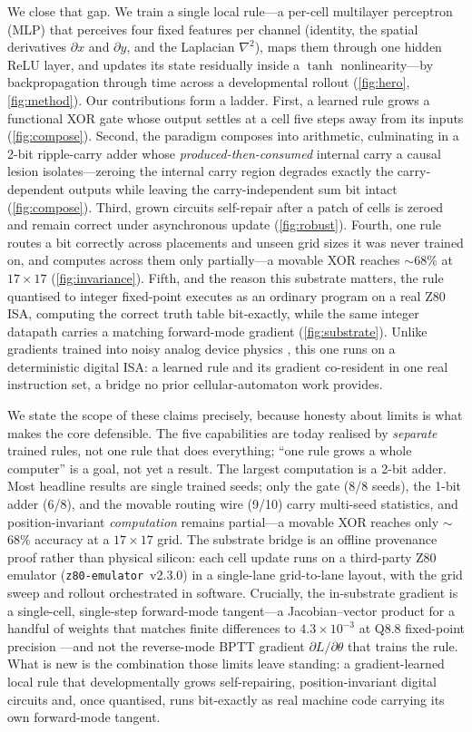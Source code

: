 We close that gap. We train a single local rule---a per-cell multilayer perceptron (MLP) that perceives four fixed features per channel (identity, the spatial derivatives $\partial x$ and $\partial y$, and the Laplacian $\nabla^2$), maps them through one hidden ReLU layer, and updates its state residually inside a $\tanh$ nonlinearity---by backpropagation through time \citep{werbos1990bptt} across a developmental rollout (\ref{fig:hero}, \ref{fig:method}). Our contributions form a ladder. First, a learned rule grows a functional XOR gate whose output settles at a cell five steps away from its inputs (\ref{fig:compose}). Second, the paradigm composes into arithmetic, culminating in a 2-bit ripple-carry adder whose \emph{produced-then-consumed} internal carry a causal lesion isolates---zeroing the internal carry region degrades exactly the carry-dependent outputs while leaving the carry-independent sum bit intact (\ref{fig:compose}). Third, grown circuits self-repair after a patch of cells is zeroed and remain correct under asynchronous update (\ref{fig:robust}). Fourth, one rule routes a bit correctly across placements and unseen grid sizes it was never trained on, and computes across them only partially---a movable XOR reaches $\sim$68\% at $17\times17$ (\ref{fig:invariance}). Fifth, and the reason this substrate matters, the rule quantised to integer fixed-point executes as an ordinary program on a real Z80 ISA, computing the correct truth table bit-exactly, while the same integer datapath carries a matching forward-mode gradient (\ref{fig:substrate}). Unlike gradients trained into noisy analog device physics \citep{wright2022deep}, this one runs on a deterministic digital ISA: a learned rule and its gradient co-resident in one real instruction set, a bridge no prior cellular-automaton work provides.

We state the scope of these claims precisely, because honesty about limits is what makes the core defensible. The five capabilities are today realised by \emph{separate} trained rules, not one rule that does everything; ``one rule grows a whole computer'' is a goal, not yet a result. The largest computation is a 2-bit adder. Most headline results are single trained seeds; only the gate (8/8 seeds), the 1-bit adder (6/8), and the movable routing wire (9/10) carry multi-seed statistics, and position-invariant \emph{computation} remains partial---a movable XOR reaches only $\sim$68\% accuracy at a $17\times17$ grid. The substrate bridge is an offline provenance proof rather than physical silicon: each cell update runs on a third-party Z80 emulator (\texttt{z80-emulator}~v2.3.0) in a single-lane grid-to-lane layout, with the grid sweep and rollout orchestrated in software. Crucially, the in-substrate gradient is a single-cell, single-step forward-mode tangent---a Jacobian--vector product for a handful of weights that matches finite differences to $4.3\times10^{-3}$ at Q8.8 fixed-point precision \citep{wengert1964ad,griewank2008evaluating}---and not the reverse-mode BPTT gradient $\partial L/\partial\theta$ that trains the rule. What is new is the combination those limits leave standing: a gradient-learned local rule that developmentally grows self-repairing, position-invariant digital circuits and, once quantised, runs bit-exactly as real machine code carrying its own forward-mode tangent.
